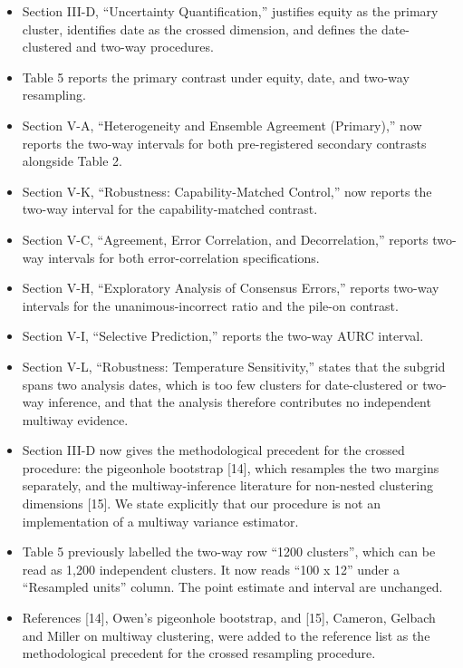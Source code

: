 \documentclass[11pt]{article}
\begin{document}
\begin{itemize}

\item Section III-D, ``Uncertainty Quantification,'' justifies equity as the primary cluster, identifies date as the crossed dimension, and defines the date-clustered and two-way procedures.

\item Table 5 reports the primary contrast under equity, date, and two-way resampling.

\item Section V-A, ``Heterogeneity and Ensemble Agreement (Primary),'' now reports the two-way intervals for both pre-registered secondary contrasts alongside Table 2.

\item Section V-K, ``Robustness: Capability-Matched Control,'' now reports the two-way interval for the capability-matched contrast.

\item Section V-C, ``Agreement, Error Correlation, and Decorrelation,'' reports two-way intervals for both error-correlation specifications.

\item Section V-H, ``Exploratory Analysis of Consensus Errors,'' reports two-way intervals for the unanimous-incorrect ratio and the pile-on contrast.

\item Section V-I, ``Selective Prediction,'' reports the two-way AURC interval.

\item Section V-L, ``Robustness: Temperature Sensitivity,'' states that the subgrid spans two analysis dates, which is too few clusters for date-clustered or two-way inference, and that the analysis therefore contributes no independent multiway evidence.

\item Section III-D now gives the methodological precedent for the crossed procedure: the pigeonhole bootstrap [14], which resamples the two margins separately, and the multiway-inference literature for non-nested clustering dimensions [15]. We state explicitly that our procedure is not an implementation of a multiway variance estimator.

\item Table 5 previously labelled the two-way row ``1200 clusters'', which can be read as 1,200 independent clusters. It now reads ``100 x 12'' under a ``Resampled units'' column. The point estimate and interval are unchanged.

\item References [14], Owen's pigeonhole bootstrap, and [15], Cameron, Gelbach and Miller on multiway clustering, were added to the reference list as the methodological precedent for the crossed resampling procedure.

\end{itemize}
\end{document}
